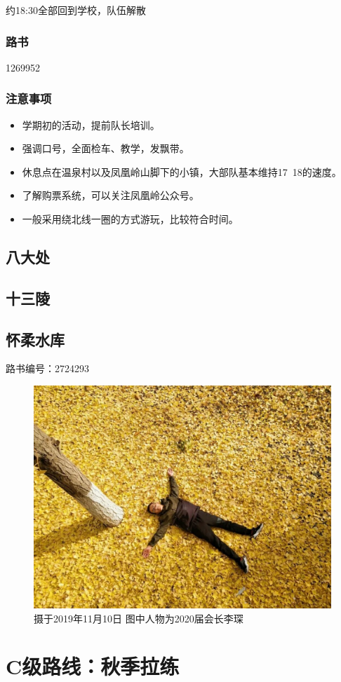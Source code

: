 \documentclass{ctexbook}
\begin{document}
约18:30全部回到学校，队伍解散

\subsubsection{路书}
1269952
\subsubsection{注意事项}
\begin{itemize}
    \item 学期初的活动，提前队长培训。
    \item 强调口号，全面检车、教学，发飘带。
    \item 休息点在温泉村以及凤凰岭山脚下的小镇，大部队基本维持17~18的速度。
    \item 了解购票系统，可以关注凤凰岭公众号。
    \item 一般采用绕北线一圈的方式游玩，比较符合时间。
\end{itemize}
\subsection{八大处}
\subsection{十三陵}
\subsection{怀柔水库}
路书编号：2724293
\begin{figure}[ht]
    \centering
    \includegraphics[width=0.8 \textwidth]{fig/怀柔水库1.jpg}
    \caption{摄于2019年11月10日 图中人物为2020届会长李琛}
\end{figure}
\section{C级路线：秋季拉练}
\end{document}

